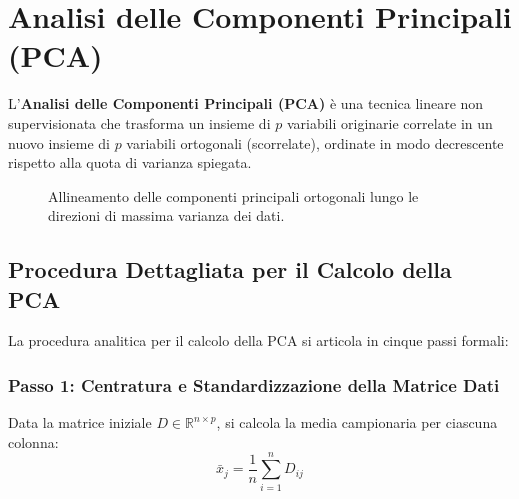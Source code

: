 \section{Analisi delle Componenti Principali (PCA)}
\label{sec:dm-pca}

L'\textbf{Analisi delle Componenti Principali (PCA)} è una tecnica lineare non supervisionata che trasforma un insieme di $p$ variabili originarie correlate in un nuovo insieme di $p$ variabili ortogonali (scorrelate), ordinate in modo decrescente rispetto alla quota di varianza spiegata.

\begin{figure}[htbp]
    \centering
    \caption{Allineamento delle componenti principali ortogonali lungo le direzioni di massima varianza dei dati.}
    \label{fig:dm-pca-axes}
\end{figure}

\subsection{Procedura Dettagliata per il Calcolo della PCA}

La procedura analitica per il calcolo della PCA si articola in cinque passi formali:

\subsubsection{Passo 1: Centratura e Standardizzazione della Matrice Dati}
Data la matrice iniziale $D \in \mathbb{R}^{n \times p}$, si calcola la media campionaria per ciascuna colonna:
\begin{equation}
    \bar{x}_j = \frac{1}{n}\sum_{i=1}^n D_{ij}
\end{equation}


